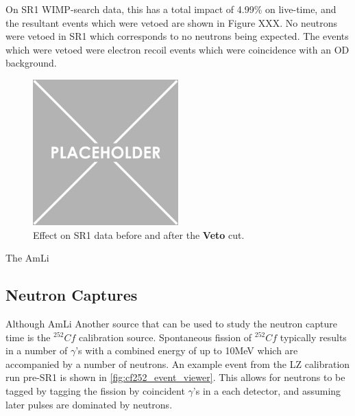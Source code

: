 


\par
On SR1 WIMP-search data, this has a total impact of 4.99\% on live-time, and the resultant events which were vetoed are shown in Figure XXX.
No neutrons were vetoed in SR1 which corresponds to no neutrons being expected.
The events which were vetoed were electron recoil events which were coincidence with an OD background.

\begin{figure}[!htbp]
    \centering
    \includegraphics[width=0.5\textwidth]{Figures/Placeholder.png}
    \caption{Effect on SR1 data before and after the \textbf{Veto} cut.}
    \label{fig:tpc_with_od_veto_in_sr1}
\end{figure}

\par
The AmLi 




\subsection{Neutron Captures}
\par
Although AmLi 
Another source that can be used to study the neutron capture time is the ${}^{252}{Cf}$ calibration source.
Spontaneous fission of ${}^{252}{Cf}$ typically results in a number of $\gamma$'s with a combined energy of up to 10MeV which are accompanied by a number of neutrons.
An example event from the LZ calibration run pre-SR1 is shown in \autoref{fig:cf252_event_viewer}.
This allows for neutrons to be tagged by tagging the fission by coincident $\gamma$'s in a each detector, and assuming later pulses are dominated by neutrons.

